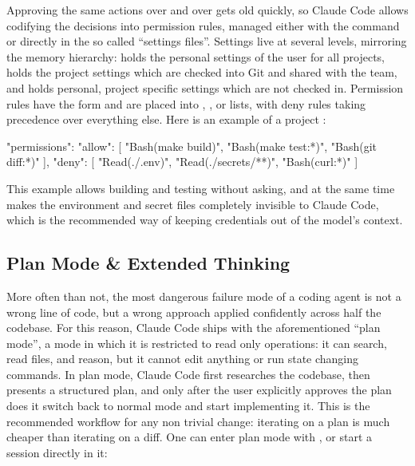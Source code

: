 Approving the same actions over and over gets old quickly, so Claude Code allows codifying the decisions into
permission rules, managed either with the  command or directly in the so called ``settings
files''. Settings live at several levels, mirroring the memory hierarchy:  holds the
personal settings of the user for all projects,  holds the project settings which are
checked into Git and shared with the team, and  holds personal, project specific
settings which are not checked in. Permission rules have the form  and are placed into
, , or  lists, with deny rules taking precedence over everything else. Here is an
example of a project :

\begin{block}
{
  "permissions": {
    "allow": [
      "Bash(make build)",
      "Bash(make test:*)",
      "Bash(git diff:*)"
    ],
    "deny": [
      "Read(./.env)",
      "Read(./secrets/**)",
      "Bash(curl:*)"
    ]
  }
}
\end{block}

This example allows building and testing without asking, and at the same time makes the environment and secret files
completely invisible to Claude Code, which is the recommended way of keeping credentials out of the model's context.

\subsection{Plan Mode \& Extended Thinking}

More often than not, the most dangerous failure mode of a coding agent is not a wrong line of code, but a wrong
approach applied confidently across half the codebase. For this reason, Claude Code ships with the aforementioned
``plan mode'', a mode in which it is restricted to read only operations: it can search, read files, and reason, but
it cannot edit anything or run state changing commands. In plan mode, Claude Code first researches the codebase, then
presents a structured plan, and only after the user explicitly approves the plan does it switch back to normal mode
and start implementing it. This is the recommended workflow for any non trivial change: iterating on a plan is much
cheaper than iterating on a diff. One can enter plan mode with , or start a session directly in it:

